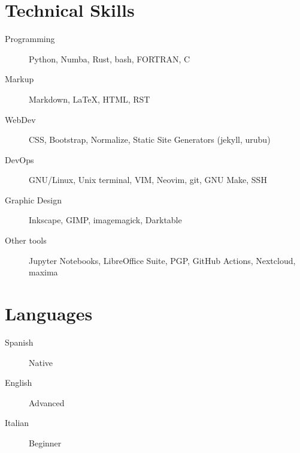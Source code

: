 \documentclass[11pt, letter]{article}
\begin{document}
\section{Technical Skills}

\begin{description}
    \item[Programming] Python, Numba, Rust, bash, FORTRAN, C
    \item[Markup] Markdown, LaTeX, HTML, RST
    \item[WebDev] CSS, Bootstrap, Normalize, Static Site Generators (jekyll,
        urubu)
    \item[DevOps] GNU/Linux, Unix terminal, VIM, Neovim, git, GNU Make, SSH
    \item[Graphic Design] Inkscape, GIMP, imagemagick, Darktable
    \item[Other tools] Jupyter Notebooks, LibreOffice Suite, PGP, GitHub
        Actions, Nextcloud, maxima
\end{description}

\section{Languages}

\begin{description}
    \item[Spanish] Native
    \item[English] Advanced
    \item[Italian] Beginner
\end{description}
\end{document}
